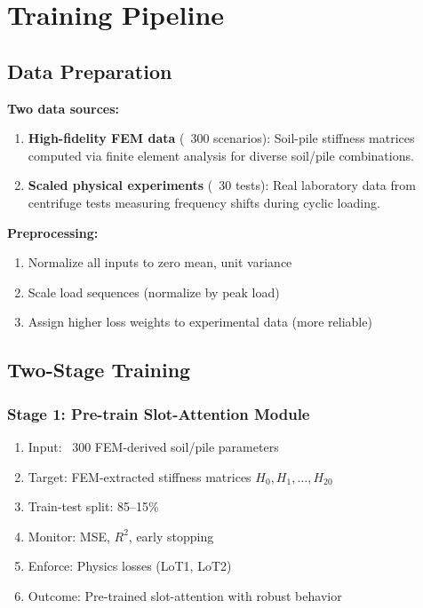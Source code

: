 \documentclass[11pt,a4paper]{article}
\begin{document}
\section{Training Pipeline}

\subsection{Data Preparation}

\textbf{Two data sources:}
\begin{enumerate}
  \item \textbf{High-fidelity FEM data} (~300 scenarios): Soil-pile stiffness matrices computed via finite element analysis for diverse soil/pile combinations.
  \item \textbf{Scaled physical experiments} (~30 tests): Real laboratory data from centrifuge tests measuring frequency shifts during cyclic loading.
\end{enumerate}

\textbf{Preprocessing:}
\begin{enumerate}
  \item Normalize all inputs to zero mean, unit variance
  \item Scale load sequences (normalize by peak load)
  \item Assign higher loss weights to experimental data (more reliable)
\end{enumerate}

\subsection{Two-Stage Training}

\subsubsection{Stage 1: Pre-train Slot-Attention Module}
\begin{enumerate}
  \item Input: ~300 FEM-derived soil/pile parameters
  \item Target: FEM-extracted stiffness matrices $H_0, H_1, \ldots, H_{20}$
  \item Train-test split: 85--15\%
  \item Monitor: MSE, $R^2$, early stopping
  \item Enforce: Physics losses (LoT1, LoT2)
  \item Outcome: Pre-trained slot-attention with robust behavior
\end{enumerate}
\end{document}
